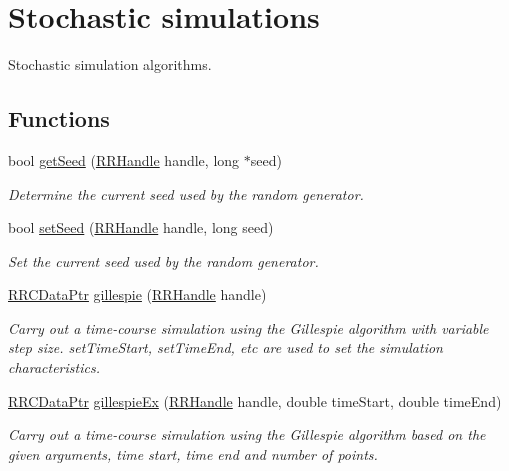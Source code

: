 \hypertarget{group__stochastic}{\section{Stochastic simulations}
\label{group__stochastic}
}


Stochastic simulation algorithms.  


\subsection*{Functions}
\begin{DoxyCompactItemize}
\item 
bool \hyperlink{group__stochastic_ga84b5d5b30763611e53bf0881bfcc2229}{get\+Seed} (\hyperlink{rrc__types_8h_a1d68f0592372208fa5a5f2799ea4b3ae}{R\+R\+Handle} handle, long $\ast$seed)
\begin{DoxyCompactList}\small\item\em Determine the current seed used by the random generator. \end{DoxyCompactList}\item 
bool \hyperlink{group__stochastic_ga050cbb1242145c14e4a5f2f152d40a01}{set\+Seed} (\hyperlink{rrc__types_8h_a1d68f0592372208fa5a5f2799ea4b3ae}{R\+R\+Handle} handle, long seed)
\begin{DoxyCompactList}\small\item\em Set the current seed used by the random generator. \end{DoxyCompactList}\item 
\hyperlink{rrc__types_8h_a9da8b124eb9c3c0045f8926c6a420b4a}{R\+R\+C\+Data\+Ptr} \hyperlink{group__stochastic_ga241498728efe5f47cc302c9315f8a663}{gillespie} (\hyperlink{rrc__types_8h_a1d68f0592372208fa5a5f2799ea4b3ae}{R\+R\+Handle} handle)
\begin{DoxyCompactList}\small\item\em Carry out a time-\/course simulation using the Gillespie algorithm with variable step size. set\+Time\+Start, set\+Time\+End, etc are used to set the simulation characteristics. \end{DoxyCompactList}\item 
\hyperlink{rrc__types_8h_a9da8b124eb9c3c0045f8926c6a420b4a}{R\+R\+C\+Data\+Ptr} \hyperlink{group__stochastic_ga4d5211689f620321e9fa934adad6490f}{gillespie\+Ex} (\hyperlink{rrc__types_8h_a1d68f0592372208fa5a5f2799ea4b3ae}{R\+R\+Handle} handle, double time\+Start, double time\+End)
\begin{DoxyCompactList}\small\item\em Carry out a time-\/course simulation using the Gillespie algorithm based on the given arguments, time start, time end and number of points. \end{DoxyCompactList}\item 

\end{DoxyCompactItemize}
